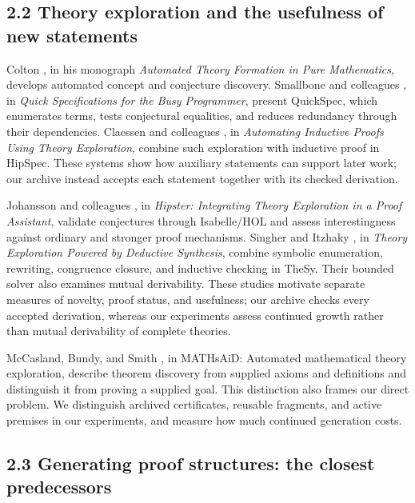 \documentclass[pdflatex,sn-basic,Numbered]{sn-jnl}
\begin{document}
\subsection*{2.2 Theory exploration and the usefulness of new statements}\label{theory-exploration-and-the-usefulness-of-new-statements}

Colton \citep{Colton2002}, in his monograph \emph{Automated Theory Formation in Pure Mathematics}, develops automated concept and conjecture discovery. Smallbone and colleagues \citep{SmallboneEtAl2017}, in \emph{Quick Specifications for the Busy Programmer}, present QuickSpec, which enumerates terms, tests conjectural equalities, and reduces redundancy through their dependencies. Claessen and colleagues \citep{ClaessenEtAl2013}, in \emph{Automating Inductive Proofs Using Theory Exploration}, combine such exploration with inductive proof in HipSpec. These systems show how auxiliary statements can support later work; our archive instead accepts each statement together with its checked derivation.

Johansson and colleagues \citep{JohanssonEtAl2014}, in \emph{Hipster: Integrating Theory Exploration in a Proof Assistant}, validate conjectures through Isabelle/HOL and assess interestingness against ordinary and stronger proof mechanisms. Singher and Itzhaky \citep{SingherItzhaky2021}, in \emph{Theory Exploration Powered by Deductive Synthesis}, combine symbolic enumeration, rewriting, congruence closure, and inductive checking in TheSy. Their bounded solver also examines mutual derivability. These studies motivate separate measures of novelty, proof status, and usefulness; our archive checks every accepted derivation, whereas our experiments assess continued growth rather than mutual derivability of complete theories.

McCasland, Bundy, and Smith \citep{McCaslandBundySmith2017}, in MATHsAiD: Automated mathematical theory exploration, describe theorem discovery from supplied axioms and definitions and distinguish it from proving a supplied goal. This distinction also frames our direct problem. We distinguish archived certificates, reusable fragments, and active premises in our experiments, and measure how much continued generation costs.

\subsection*{2.3 Generating proof structures: the closest predecessors}\label{generating-proof-structures-the-closest-predecessors}
\end{document}
